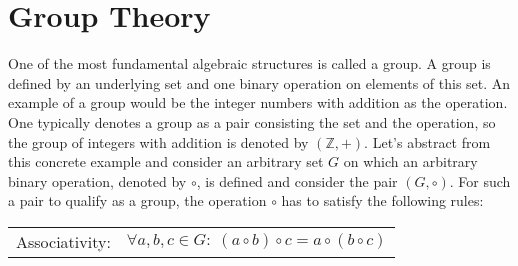 \section{Group Theory} 
One of the most fundamental algebraic structures is called a group. A group is defined by an underlying set and one binary operation on elements of this set. An example of a group would be the integer numbers with addition as the operation. One typically denotes a group as a pair consisting the set and the operation, so the group of integers with addition is denoted by $(\mathbb{Z},+)$. Let's abstract from this concrete example and consider an arbitrary set $G$ on which an arbitrary binary operation, denoted by $\circ$, is defined and consider the pair $(G,\circ)$. For such a pair to qualify as a group, the operation $\circ$ has to satisfy the following rules:

\medskip
\begin{tabular}{c l}
Associativity: & $\forall a,b,c \in G: \;  (a \circ b) \circ c = a \circ (b \circ c)$   \\
\end{tabular}
\medskip









\begin{comment}

https://en.wikipedia.org/wiki/Group_(mathematics)

\end{comment}